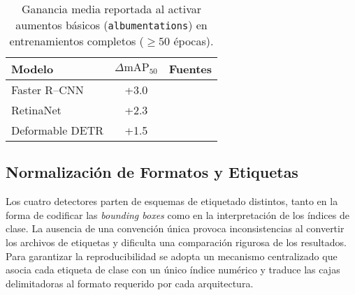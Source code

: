 \begin{table}[!h]
    \centering
    \caption{Ganancia media reportada al activar aumentos básicos (\texttt{albumentations}) en entrenamientos completos ($\ge 50$ épocas).}
    \label{tab:aug_lit}
    \begin{tabular}{|l|c|l|}
        \hline
        \textbf{Modelo} & \(\Delta\text{mAP}_{50}\) & \textbf{Fuentes} \\ \hline
        Faster R--CNN    & +3.0 &~\cite{mdpi2020vehicles,mathworksRCNN} \\ \hline
        RetinaNet        & +2.3 &~\cite{cubuk2020autoaug,retinanetCOCO} \\ \hline
        Deformable DETR  & +1.5 &~\cite{rtdetr2024cvpr,smallobjDETR} \\ \hline
    \end{tabular}
\end{table}


\subsection{Normalización de Formatos y Etiquetas}\label{ssec:label_norm}

Los cuatro detectores parten de esquemas de etiquetado distintos, tanto en la forma de codificar las \emph{bounding boxes} como en la interpretación de los índices de clase.
La ausencia de una convención única provoca inconsistencias al convertir los archivos de etiquetas y dificulta una comparación rigurosa de los resultados.
Para garantizar la reproducibilidad se adopta un mecanismo centralizado que asocia cada etiqueta de clase con un único índice numérico y traduce las cajas delimitadoras al formato requerido por cada arquitectura.

